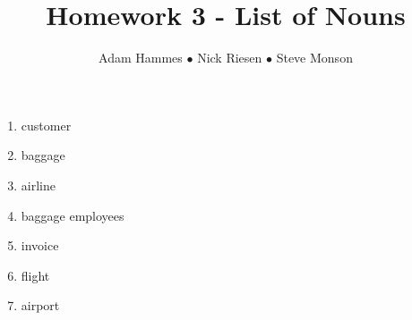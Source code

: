\documentclass{article}
\title{Homework 3 - List of Nouns}
\author{Adam Hammes $\bullet$ Nick Riesen $\bullet$ Steve Monson}
\begin{document}
\maketitle

\begin{enumerate}
    \item customer
    \item baggage
    \item airline
    \item baggage employees
    \item invoice
    \item flight
    \item airport
\end{enumerate}
\end{document}
